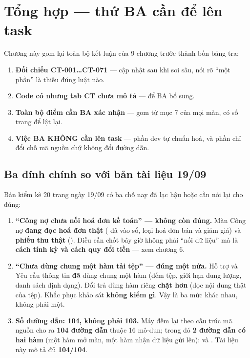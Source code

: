 \chapter{Tổng hợp --- thứ BA cần để lên task}

Chương này gom lại toàn bộ kết luận của 9 chương trước thành bốn bảng tra:

\begin{enumerate}[leftmargin=*]
  \item \textbf{Đối chiếu CT-001…CT-071} --- cập nhật sau khi soi sâu, nói rõ ``một phần'' là
        thiếu đúng luật nào.
  \item \textbf{Code có nhưng tab CT chưa mô tả} --- để BA bổ sung.
  \item \textbf{Toàn bộ điểm cần BA xác nhận} --- gom từ mục 7 của mọi màn, có số trang để lật
        lại.
  \item \textbf{Việc BA KHÔNG cần lên task} --- phần dev tự chuẩn hoá, và phần chỉ đổi chỗ mã
        nguồn chứ không đổi đường dẫn.
\end{enumerate}

\section{Ba đính chính so với bản tài liệu 19/09}

Bản kiểm kê 20 trang ngày 19/09 có ba chỗ nay đã lạc hậu hoặc cần nói lại cho đúng:

\begin{enumerate}[leftmargin=*]
  \item \textbf{``Công nợ chưa nối hoá đơn kế toán'' --- không còn đúng.} Màn Công nợ
        \textbf{đang đọc hoá đơn thật} ( đã vào sổ, loại hoá đơn bán và giảm
        giá) và \textbf{phiếu thu thật} (). Điều cần chốt bây giờ không
        phải ``nối dữ liệu'' mà là \textbf{cách tính kỳ và cách quy đổi tiền} --- xem chương 6.
  \item \textbf{``Chưa dùng chung một hàm tải tệp'' --- đúng một nửa.} Hỗ trợ và Yêu cầu thông
        tin \textbf{đã} dùng chung một hàm (đếm tệp, giới hạn dung lượng, danh sách định dạng).
        Đổi trả dùng hàm riêng \textbf{chặt hơn} (đọc nội dung thật của tệp). Khắc phục khảo
        sát \textbf{không kiểm gì}. Vậy là ba mức khác nhau, không phải một.
  \item \textbf{Số đường dẫn: 104, không phải 103.} Máy đếm lại theo cấu trúc mã nguồn cho ra
        \textbf{104 đường dẫn} thuộc 16 mô-đun; trong đó \textbf{2 đường dẫn có hai hàm} (một
        hàm mở màn, một hàm nhận dữ liệu gửi lên):  và
        . Tài liệu này mô tả đủ \textbf{104/104}.
\end{enumerate}

